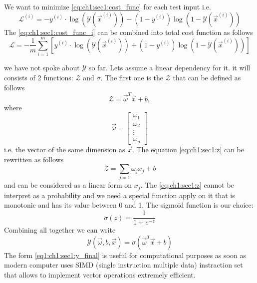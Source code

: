 We want to minimize \cref{eq:ch1:sec1:cost_func} for each test input i.e.
\begin{equation}
  \mathcal{L}^{(i)} = - y^{(i)} \cdot \log\left(\mathcal{Y}\left(\vec{x}^{(i)}\right)\right) -
(1-y^{(i)}) \log \left(1 - \mathcal{Y}\left(\vec{x}^{(i)}\right)\right)
  \label{eq:ch1:sec1:cost_func_i}
\end{equation}
The \cref{eq:ch1:sec1:cost_func_i} can be combined into total cost function as
follows
\begin{equation}
  \mathcal{L} = - \frac{1}{m} \sum_{i = 1}^{m} \left[ y^{(i)} \cdot \log \left(\mathcal{Y}\left(\vec{x}^{(i)}\right)\right) +
(1-y^{(i)}) \log \left(1 - \mathcal{Y}\left(\vec{x}^{(i)}\right)\right)\right]
  \label{eq:ch1:sec1:cost_func_total}
\end{equation}

we have not spoke about $\mathcal{Y}$ so far. Lets assume a linear dependency
for it. it will consists of 2 functions: $\mathcal{Z}$ and $\sigma$. The first
one is the $\mathcal{Z}$ that can be defined as follows
\begin{equation}
  \mathcal{Z} = \vec{\omega}^T \vec{x} + b,
  \label{eq:ch1:sec1:z}
\end{equation}
where
\[
\vec{\omega} =
\begin{bmatrix}
  \omega_{1} \\
  \omega_{2} \\
  \vdots \\
  \omega_{n}
\end{bmatrix}
\]
i.e. the vector of the same dimension as $\vec{x}$.
The equation \cref{eq:ch1:sec1:z} can be rewritten as follows
\[
\mathcal{Z} = \sum_{j = 1} \omega_j x_j +b
\]
and can be considered as a linear form on ${x_j}$. The \cref{eq:ch1:sec1:z}
cannot be interpret as a probability and we need a special function apply on it
that is monotonic \cite{wiki:monotonic_func} and has its value between 0 and
1. The sigmoid function is our choice:
\[
\sigma\left(z\right) = \frac{1}{1+e^{-z}}
\]
Combining all together we can write
\begin{equation}
  \mathcal{Y}\left(\vec{\omega}, b, \vec{x}\right) =
  \sigma\left(\vec{\omega}^T \vec{x} + b\right)
  \label{eq1:ch1:sec1:y_final}
\end{equation}
The form \cref{eq1:ch1:sec1:y_final} is useful for computational purposes as
soon as modern computer uses SIMD (single instruction multiple data) instraction
set that allows to implement vector operations extremely efficient.

